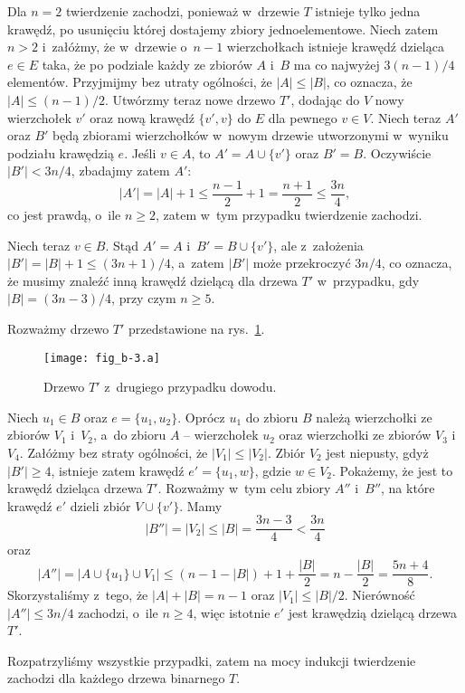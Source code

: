 Dla $n=2$ twierdzenie zachodzi, ponieważ w~drzewie $T$ istnieje tylko jedna krawędź, po usunięciu której dostajemy zbiory jednoelementowe.
Niech zatem $n>2$ i~załóżmy, że w~drzewie o~$n-1$ wierzchołkach istnieje krawędź dzieląca $e\in E$ taka, że po podziale każdy ze zbiorów $A$ i~$B$ ma co najwyżej $3(n-1)/4$ elementów.
Przyjmijmy bez utraty ogólności, że $|A|\le|B|$, co oznacza, że $|A|\le(n-1)/2$.
Utwórzmy teraz nowe drzewo $T'$, dodając do $V$ nowy wierzchołek $v'$ oraz nową krawędź $\{v',v\}$ do $E$ dla pewnego $v\in V$.
Niech teraz $A'$ oraz $B'$ będą zbiorami wierzchołków w~nowym drzewie utworzonymi w~wyniku podziału krawędzią $e$.
Jeśli $v\in A$, to $A'=A\cup\{v'\}$ oraz $B'=B$.
Oczywiście $|B'|<3n/4$, zbadajmy zatem $A'$:
\[
	|A'| = |A|+1 \le \frac{n-1}{2}+1 = \frac{n+1}{2} \le \frac{3n}{4},
\]
co jest prawdą, o~ile $n\ge2$, zatem w~tym przypadku twierdzenie zachodzi.

Niech teraz $v\in B$.
Stąd $A'=A$ i~$B'=B\cup \{v'\}$, ale z~założenia $|B'|=|B|+1\le(3n+1)/4$, a~zatem $|B'|$ może przekroczyć $3n/4$, co oznacza, że musimy znaleźć inną krawędź dzielącą dla drzewa $T'$ w~przypadku, gdy $|B|=(3n-3)/4$, przy czym $n\ge5$.

Rozważmy drzewo $T'$ przedstawione na rys.~\ref{fig:B-3a}.
\begin{figure}[ht]
	\begin{center}
		\texttt{[image: fig\_b-3.a]}
	\end{center}
	\caption{Drzewo $T'$ z~drugiego przypadku dowodu.} \label{fig:B-3a}
\end{figure}
Niech $u_1\in B$ oraz $e=\{u_1,u_2\}$.
Oprócz $u_1$ do zbioru $B$ należą wierzchołki ze zbiorów $V_1$ i~$V_2$, a~do zbioru $A$ -- wierzchołek $u_2$ oraz wierzchołki ze zbiorów $V_3$ i~$V_4$.
Załóżmy bez straty ogólności, że $|V_1|\le|V_2|$.
Zbiór $V_2$ jest niepusty, gdyż $|B'|\ge4$, istnieje zatem krawędź $e'=\{u_1,w\}$, gdzie $w\in V_2$.
Pokażemy, że jest to krawędź dzieląca drzewa $T'$.
Rozważmy w~tym celu zbiory $A''$ i~$B''$, na które krawędź $e'$ dzieli zbiór $V\cup\{v'\}$.
Mamy
\[
	|B''| = |V_2| \le |B| = \frac{3n-3}{4} < \frac{3n}{4}
\]
oraz
\[
	|A''| = \bigl|A\cup\{u_1\}\cup V_1\bigr| \le (n-1-|B|)+1+\frac{|B|}{2} = n-\frac{|B|}{2} = \frac{5n+4}{8}.
\]
Skorzystaliśmy z~tego, że $|A|+|B|=n-1$ oraz $|V_1|\le|B|/2$.
Nierówność $|A''|\le3n/4$ zachodzi, o~ile $n\ge4$, więc istotnie $e'$ jest krawędzią dzielącą drzewa $T'$.

Rozpatrzyliśmy wszystkie przypadki, zatem na mocy indukcji twierdzenie zachodzi dla każdego drzewa binarnego $T$.

